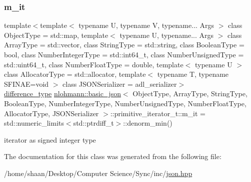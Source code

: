\subsubsection{\texorpdfstring{m\+\_\+it}{m\_it}}
{\footnotesize\ttfamily template$<$template$<$ typename U, typename V, typename... Args $>$ class Object\+Type = std\+::map, template$<$ typename U, typename... Args $>$ class Array\+Type = std\+::vector, class String\+Type  = std\+::string, class Boolean\+Type  = bool, class Number\+Integer\+Type  = std\+::int64\+\_\+t, class Number\+Unsigned\+Type  = std\+::uint64\+\_\+t, class Number\+Float\+Type  = double, template$<$ typename U $>$ class Allocator\+Type = std\+::allocator, template$<$ typename T, typename S\+F\+I\+N\+A\+E=void $>$ class J\+S\+O\+N\+Serializer = adl\+\_\+serializer$>$ \\
\hyperlink{classnlohmann_1_1basic__json_afe7c1303357e19cea9527af4e9a31d8f}{difference\+\_\+type} \hyperlink{classnlohmann_1_1basic__json}{nlohmann\+::basic\+\_\+json}$<$ Object\+Type, Array\+Type, String\+Type, Boolean\+Type, Number\+Integer\+Type, Number\+Unsigned\+Type, Number\+Float\+Type, Allocator\+Type, J\+S\+O\+N\+Serializer $>$\+::primitive\+\_\+iterator\+\_\+t\+::m\+\_\+it = std\+::numeric\+\_\+limits$<$std\+::ptrdiff\+\_\+t$>$\+::denorm\+\_\+min()\hspace{0.3cm}{\ttfamily [private]}}



iterator as signed integer type 



The documentation for this class was generated from the following file\+:\begin{DoxyCompactItemize}
\item 
/home/shaan/\+Desktop/\+Computer Science/\+Sync/inc/\hyperlink{json_8hpp}{json.\+hpp}\end{DoxyCompactItemize}
